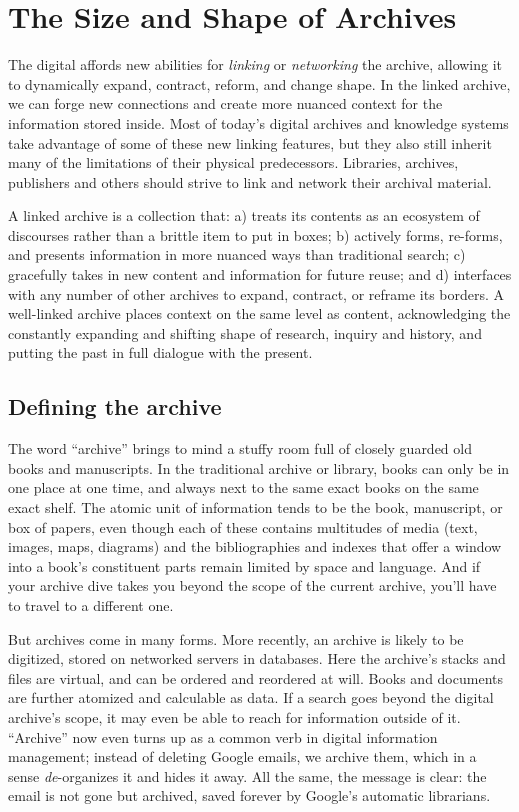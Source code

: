 \chapter{The Size and Shape of Archives}


The digital affords new abilities for \emph{linking} or \emph{networking} the archive, allowing it to dynamically expand, contract, reform, and change shape. In the linked archive, we can forge new connections and create more nuanced context for the information stored inside. Most of today's digital archives and knowledge systems take advantage of some of these new linking features, but they also still inherit many of the limitations of their physical predecessors. Libraries, archives, publishers and others should strive to link and network their archival material.

A linked archive is a collection that: a) treats its contents as an ecosystem of discourses rather than a brittle item to put in boxes; b) actively forms, re-forms, and presents information in more nuanced ways than traditional search; c) gracefully takes in new content and information for future reuse; and d) interfaces with any number of other archives to expand, contract, or reframe its borders. A well-linked archive places context on the same level as content, acknowledging the constantly expanding and shifting shape of research, inquiry and history, and putting the past in full dialogue with the present.

\section{Defining the archive}

The word ``archive'' brings to mind a stuffy room full of closely guarded old books and manuscripts. In the traditional archive or library, books can only be in one place at one time, and always next to the same exact books on the same exact shelf. The atomic unit of information tends to be the book, manuscript, or box of papers, even though each of these contains multitudes of media (text, images, maps, diagrams) and the bibliographies and indexes that offer a window into a book's constituent parts remain limited by space and language. And if your archive dive takes you beyond the scope of the current archive, you'll have to travel to a different one.

But archives come in many forms. More recently, an archive is likely to be digitized, stored on networked servers in databases. Here the archive's stacks and files are virtual, and can be ordered and reordered at will. Books and documents are further atomized and calculable as data. If a search goes beyond the digital archive's scope, it may even be able to reach for information outside of it. ``Archive'' now even turns up as a common verb in digital information management; instead of deleting Google emails, we archive them, which in a sense \emph{de}-organizes it and hides it away. All the same, the message is clear: the email is not gone but archived, saved forever by Google's automatic librarians.

